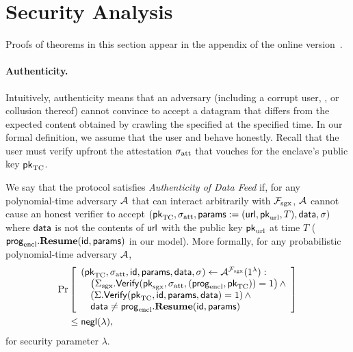 \section{Security Analysis}
\label{sec:analysis}

Proofs of theorems in this section appear in the appendix of the online version~\cite{cryptoeprint:2016:168}.


\paragraph{Authenticity.}
Intuitively, authenticity means that an adversary (including a corrupt user, \medname, or collusion thereof)
cannot convince \tcont to accept a datagram that differs from the expected content obtained by crawling the specified \weburl at the specified time.
In our formal definition, we assume that the user and \tcont behave honestly.
Recall that the user must verify upfront the attestation ${\sigma_{\textrm{att}}}$ that vouches for the enclave's public key ${\sf pk}_{\textrm{TC}}$.

\begin{definition}
\label{defn:auth}
We say that the \tc protocol satisfies \emph{Authenticity of Data Feed} if,
for any polynomial-time adversary $\mathcal{A}$ that can interact arbitrarily with $\mathcal{F}_{\textrm{sgx}}$,
$\mathcal{A}$ cannot cause an honest verifier to accept $({\sf pk}_{\textrm{TC}}, {\sigma_{\textrm{att}}}, {\sf params}:=({{\sf url}}, {\sf pk}_{\textrm{url}}, T), {\sf data}, \sigma)$
where ${\sf data}$ is not the contents of ${{\sf url}}$ with the public key ${\sf pk}_{\textrm{url}}$ at time $T$ (${\sf prog}_{\textrm{encl}}.{\bf Resume}({\sf id}, {\sf params})$ in our model).
More formally, for any probabilistic polynomial-time adversary $\mathcal{A}$,
\begin{align*}
  \Pr & \left[
\begin{array}{l}
({\sf pk}_{\textrm{TC}}, {\sigma_{\textrm{att}}}, {\sf id}, {\sf params}, {\sf data}, \sigma) \leftarrow 
\mathcal{A}^{\mathcal{F}_{\textrm{sgx}}}(1^\lambda) :\\
\quad \left({\Sigma_{\textrm{sgx}}}.{\sf Verify}({\sf pk}_{\mathrm{sgx}}, {\sigma_{\textrm{att}}}, ({\sf prog}_{\textrm{encl}}, {\sf pk}_{\textrm{TC}})) = 1\right) \wedge \\
\quad \left(\Sigma.{\sf Verify}({\sf pk}_{\textrm{TC}}, {\sf id}, {\sf params}, {\sf data})  = 1\right) \wedge\\
\quad {\sf data} \neq {\sf prog}_{\textrm{encl}}.{\bf Resume}({\sf id}, {\sf params})
\end{array}
\right] \\
& \leq {\sf negl}(\lambda),
\end{align*}
for security parameter $\lambda$.
\end{definition}

